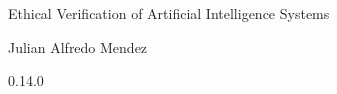 \documentclass[12pt,a4paper]{book}
\begin{document}
    \begin{center}

        \phantom{H}

        \vspace{80mm}

        {\huge{Ethical Verification of Artificial Intelligence Systems}}

        \vspace{80mm}
        Julian Alfredo Mendez

        \vspace{10mm}
        0.14.0

    \end{center}

    \newpage

    \tableofcontents

    
    

    
    
    

    \appendix
    
    

    
    
\end{document}
